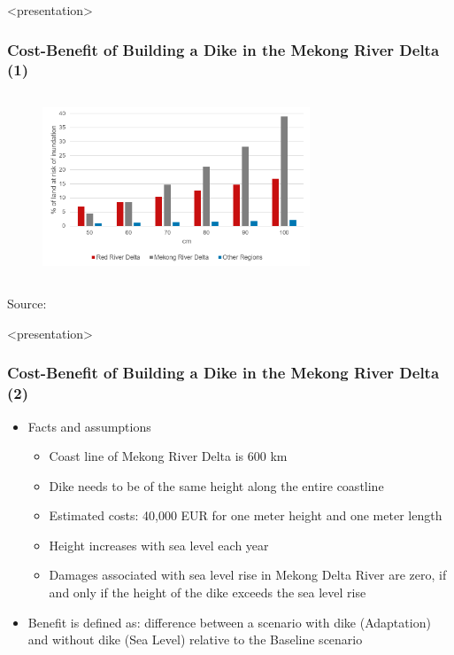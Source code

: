 \documentclass[11pt,aspectratio=169]{beamer}
\begin{document}
\begin{frame}<presentation>
	\frametitle{Cost-Benefit of Building a Dike in the Mekong River Delta (1)}
	\begin{figure}
	\includegraphics[width=8cm,height=5.5cm]{pictures/Sea_Level_Rise_Vietnam}
	\end{figure}
	{\footnotesize Source: \cite{thuc2016climate}}
\end{frame}

\begin{frame}<presentation>
	\frametitle{Cost-Benefit of Building a Dike in the Mekong River Delta (2)}
	\begin{itemize}
		\item Facts and assumptions 
		\begin{itemize}
			\item Coast line of Mekong River Delta is 600 km
			\item Dike needs to be of the same height along the entire coastline
			\item Estimated costs: 40,000 EUR for one meter height and one meter length 
			\item Height increases with sea level each year
			\item Damages associated with sea level rise in Mekong Delta River are zero, if and only if the height of the dike exceeds the sea level rise
		\end{itemize}	
		\item Benefit is defined as: difference between a scenario with dike (Adaptation) and without dike (Sea Level) relative to the Baseline scenario
	\end{itemize}
\end{frame}
\end{document}
